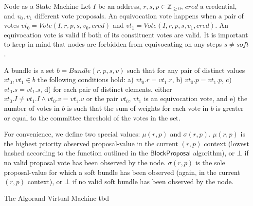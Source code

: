 \documentclass[10pt,a4paper]{article}
\begin{document}
\begin{section}{Node as a State Machine}
Let $I$ be an address, $r, s, p\in\mathbb{Z}_{\ge 0}$, $cred$ a credential, and $v_0,v_1$ different
vote proposals.
An {\sf equivocation vote} happens when a pair of votes
$vt_0 = Vote(I, r, p, s, v_0, cred)$ and $vt_1 = Vote(I, r, p, s, v_1, cred)$.
An equivocation vote is valid if both of its constituent votes are valid.
It is important to keep in mind that nodes are forbidden from equivocating 
on any steps $s \neq soft$.

A {\sf bundle} is a set $b = Bundle(r,p,s,v)$ such that for any pair of distinct values 
$vt_0, vt_1 \in b$ the following conditions hold: 
a) $vt_0.r = vt_1.r $, 
b) $vt_0.p = vt_1.p$,
c) $vt_0.s = vt_1.s$,
d) for each pair of distinct elements, either $vt_0.I \neq vt_1.I \land vt_0.v = vt_1.v$ or the pair $vt_0$, $vt_1$ 
is an equivocation vote, and
e) the number of votes in $b$ is such that the sum of weights for each vote in $b$ is greater or equal to the
committee threshold of the votes in the set.

For convenience, we define two special values: $\mu(r,p)$ and $\sigma(r,p)$.
$\mu(r,p)$ is the highest priority observed proposal-value in the current $(r,p)$ context 
(lowest hashed according to the function outlined in the $\mathsf{BlockProposal}$ algorithm), 
or $\bot$ if no valid proposal vote has been observed by the node.
$\sigma(r,p)$ is the sole proposal-value for which a soft bundle has been observed (again, 
in the current $(r,p)$ context), or $\bot$ if no valid soft bundle has been observed by the 
node.

\begin{subsection}{The Algorand Virtual Machine}\label{sect:avm}
    tbd
\end{subsection}

\end{section}
\end{document}
